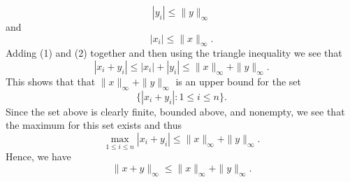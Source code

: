 \documentclass{article}
\begin{document}
\begin{enumerate}
\begin{remark}
        \[  | {y}_{i} |  \leq \|y\|_{\infty } \tag{1} \]
        and
        \[  | {x}_{i} |  \leq \|x\|_{\infty }. \tag{2} \]
        Adding (1) and (2) together and then using the triangle inequality we see that
        \[ | {x}_{i} + {y}_{i} | \leq  | {x}_{i} | + | {y}_{i} | \leq \|x\|_{\infty } +  \|y\|_{\infty }.   \]
        This shows that that \( \|x\|_{\infty } + \|y\|_{\infty } \) is an upper bound for the set 
        \[  \{ | {x}_{i} + {y}_{i} | : 1 \leq i \leq n  \}.  \]
        Since the set above is clearly finite, bounded above, and nonempty, we see that the maximum for this set exists and thus
        \[  \max_{1 \leq i \leq n} | {x}_{i} + {y}_{i}  | \leq \|x\|_{\infty } + \|y\|_{\infty }. \]
        Hence, we have
        \[  \|x + y\|_{\infty } \leq \|x\|_{\infty } + \|y\|_{\infty }.  \]
        

\end{remark}
\end{enumerate}
\end{document}
